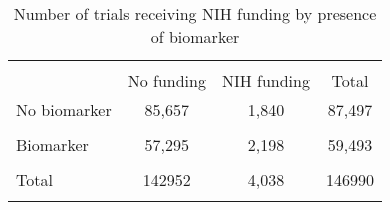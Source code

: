 \begin{table}[htbp]\centering
\def\sym#1{\ifmmode^{#1}\else\(^{#1}\)\fi}
\caption{Number of trials receiving NIH funding by presence of biomarker}
\begin{tabular}{l*{3}{c}}
\hline\hline
                &\multicolumn{3}{c}{}                                    \\
                &No funding         &NIH funding         &    Total         \\
\hline
No biomarker    &   85,657         &    1,840         &   87,497         \\
                &                  &                  &                  \\
[1em]
Biomarker       &   57,295         &    2,198         &   59,493         \\
                &                  &                  &                  \\
[1em]
Total           &   142952         &    4,038         &   146990         \\
                &                  &                  &                  \\
\hline\hline
\end{tabular}
\end{table}
